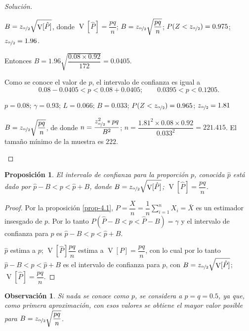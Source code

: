 \documentclass[a5paper,doc,10pt,noapacite]{apa6}
\DeclareMathOperator{\Var}{V}
\newtheorem{proposicion}{Proposición}
\newtheorem{observ}{Observación}
\begin{document}
{{\begin{proof}[Solución]
\begin{APAenumerate}
		\(B=z_{\nicefrac{\alpha}{2}}\sqrt{\Var[\hat{P}]}\), donde \(\Var[\hat{P}]=\dfrac{pq}{n}\); \(B=z_{\nicefrac{\alpha}{2}}\sqrt{\dfrac{pq}{n}}\); \(P(Z<z_{\nicefrac{\alpha}{2}})=0.975\); \(z_{\nicefrac{\alpha}{2}}=1.96\).
		
		Entonces  \(B=1.96\sqrt{\dfrac{0.08 \times 0.92}{172}}=0.0405\).
		
		Como se conoce el valor de \(p\), el intervalo de confianza es igual a 
		\[0.08-0.0405<p<0.08+0.0405 ; \qquad 0.0395<p<0.1205.\]
		
		\vspace{1\baselineskip}
		\item \(p=0.08\); \(\gamma=0.93\); \(L=0.066\); \(B=0.033\); \(P(Z<z_{\nicefrac{\alpha}{2}})=0.965\); \(z_{\nicefrac{\alpha}{2}}=1.81\)
		
		\(B=z_{\nicefrac{\alpha}{2}}\sqrt{\dfrac{pq}{n}}\), de donde \(n=\dfrac{z_{\nicefrac{\alpha}{2}}^2*pq}{B^2}\); \(n=\dfrac{1.81^2 \times 0.08 \times 0.92}{0.033^2}=221.415\). El tamaño mínimo de la muestra es \(222\).		\qedhere
	\end{APAenumerate}
\end{proof}


\begin{proposicion}\label{prop-5.4}
	El intervalo de confianza para la proporción \(p\), conocida \(\hat{p}\) está dado por \(\hat{p}-B<p<\hat{p}+B\), donde \(B=z_{\nicefrac{\alpha}{2}}\sqrt{\Var[\hat{P}]}\); \(\Var[\hat{P}]=\dfrac{pq}{n}\).
\end{proposicion}
\begin{proof}
	Por la proposición \eqref{prop-4.1}, \(P=\dfrac{X}{n}=\dfrac{1}{n}\displaystyle\sum_{i=1}^{n}X_i=\bar{X}\) es un estimador insesgado de \(p\). Por lo tanto \(P(\hat{P}-B<p<\hat{P}-B)=\gamma\) y el intervalo de confianza para \(p\) es \(\hat{p}-B<p<\hat{p}+B\).
	
	\(\hat{p}\) estima a \(p\); \(\Var[\hat{P}]\dfrac{pq}{n}\) estima a \(\Var[P]=\dfrac{pq}{n}\), con lo cual por lo tanto \(\hat{p}-B<p<\hat{p}+B\) es el intervalo de confianza para \(p\), con \(B=z_{\nicefrac{\alpha}{2}}\sqrt{\Var[\hat{P}]}\); \(\Var[\hat{P}]=\dfrac{pq}{n}\).
\end{proof}


\begin{observ}
	Si nada se conoce como \(p\), se considera a \(p=q=0.5\), ya que, como primera aproximación, con esos valores se obtiene el mayor valor posible para \(B=z_{\nicefrac{\alpha}{2}}\sqrt{\dfrac{pq}{n}}\).
\end{observ}

}}
\end{document}
